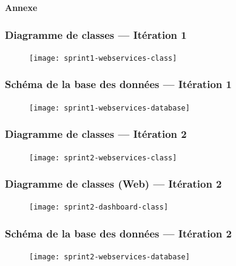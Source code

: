 \documentclass{beamer}
\begin{document}
\begin{frame}
    \begin{center}
        \bfseries \Huge
        Annexe
    \end{center}
\end{frame}

{%
    \begin{frame}[plain]
     \end{frame}
}

\begin{frame}
    \frametitle{Diagramme de classes --- Itération 1}
    \begin{figure}
        \texttt{[image: sprint1-webservices-class]}
    \end{figure}
\end{frame}

\begin{frame}
    \frametitle{Schéma de la base des données --- Itération 1}
    \begin{figure}
        \texttt{[image: sprint1-webservices-database]}
    \end{figure}
\end{frame}

\begin{frame}
    \frametitle{Diagramme de classes --- Itération 2}
    \begin{figure}
        \texttt{[image: sprint2-webservices-class]}
    \end{figure}
\end{frame}

\begin{frame}
    \frametitle{Diagramme de classes (Web) --- Itération 2}
    \begin{figure}
        \texttt{[image: sprint2-dashboard-class]}
    \end{figure}
\end{frame}

\begin{frame}
    \frametitle{Schéma de la base des données --- Itération 2}
    \begin{figure}
        \texttt{[image: sprint2-webservices-database]}
    \end{figure}
\end{frame}
\end{document}
